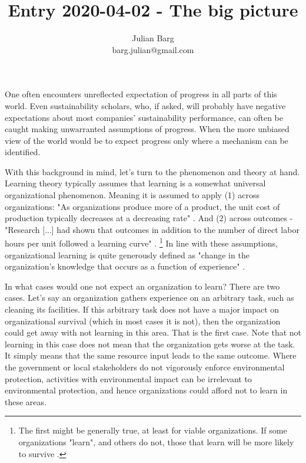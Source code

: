 \documentclass[12pt, man, natbib]{apa6}
\title{Entry 2020-04-02 - The big picture}
\author{Julian Barg\\barg.julian@gmail.com}
\affiliation{Ivey Business School}
\begin{document}
	
	\maketitle
	
	\singlespacing
	
	\section{}
	One often encounters unreflected expectation of progress in all parts of this world. Even sustainability scholars, who, if asked, will probably have negative expectations about most companies' sustainability performance, can often be caught making unwarranted assumptions of progress. When the more unbiased view of the world would be to expect progress only where a mechanism can be identified.
	
	With this background in mind, let's turn to the phenomenon and theory at hand. Learning theory typically assumes that learning is a somewhat universal organizational phenomenon. Meaning it is assumed to apply (1) across organizations: "As organizations produce more of a product, the unit cost of production typically decreases at a decreasing rate" \citep[1]{Argote2013a}. And (2) across outcomes - "Research [...] had shown that outcomes in addition to the number of direct labor hours per unit followed a learning curve" \citep[6]{Argote2013a}.
		\footnote{The first might be generally true, at least for viable organizations. If some organizations "learn", and others do not, those that learn will be more likely to survive \citep{Cyert1963b}.}
	In line with these assumptions, organizational learning is quite generously defined as "change in the organization's knowledge that occurs as a function of experience" \citep[31]{Argote2013b}.
		
	In what cases would one not expect an organization to learn? There are two cases. Let's say an organization gathers experience on an arbitrary task, such as cleaning its facilities. If this arbitrary task does not have a major impact on organizational survival (which in most cases it is not), then the organization could get away with not learning in this area. That is the first case. Note that not learning in this case does not mean that the organization gets worse at the task. It simply means that the same resource input leads to the same outcome. Where the government or local stakeholders do not vigorously enforce environmental protection, activities with environmental impact can be irrelevant to environmental protection, and hence organizations could afford not to learn in these areas.
	
\end{document}
